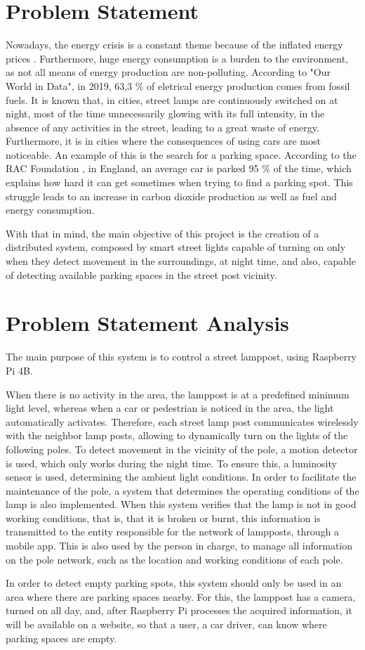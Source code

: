 \section{Problem Statement}
Nowadays, the energy crisis is a constant theme because of the inflated energy prices \cite{energy_crisis}. Furthermore, huge energy consumption is a burden to the environment, as not all means of energy production are non-polluting. According to "Our World in Data"\cite{owidenergy}, in 2019, 63,3 \% of eletrical energy production comes from fossil fuels. It is known that, in cities, street lamps are continuously switched on at night, most of the time unnecessarily glowing with its full intensity, in the absence of any activities in the street, leading to a great waste of energy. Furthermore, it is in cities where the consequences of using cars are most noticeable. An example of this is the search for a parking space. According to the RAC Foundation \cite{cars_parked}, in England, an average car is parked 95 \% of the time, which explains how hard it can get sometimes when trying to find a parking spot. This struggle leads to an increase in carbon dioxide production as well as fuel and energy consumption.

With that in mind, the main objective of this project is the creation of a  distributed system, composed by smart street lights capable of turning on only when they detect movement in the surroundings, at night time, and also, capable of detecting available parking spaces in the street post vicinity.

\clearpage
\section{Problem Statement Analysis}
The main purpose of this system is to control a street lamppost, using Raspberry Pi 4B.

When there is no activity in the area, the lamppost is at a predefined minimum light level, whereas when a car or pedestrian is noticed in the area, the light automatically activates. Therefore, each street lamp post  communicates wirelessly with the neighbor lamp posts, allowing to dynamically turn on the lights of the following poles. To detect movement in the vicinity of the pole, a motion detector is used, which only works during the night time. To ensure this, a luminosity sensor is used, determining the ambient light conditions. In order to facilitate the maintenance of the pole, a system that determines the operating conditions of the lamp is also implemented. When this system verifies that the lamp is not in good working conditions, that is, that it is broken or burnt, this information is transmitted to the entity responsible for the network of lampposts, through a mobile app. This is also used by the person in charge, to manage all information on the pole network, such as the location and working conditions of each pole.

In order to detect empty parking spots, this system should only be used in an area where there are parking spaces nearby. For this, the lamppost has a camera, turned on all day, and, after Raspberry Pi processes the acquired information, it will be available on a website, so that a user, a car driver, can know where parking spaces are empty.